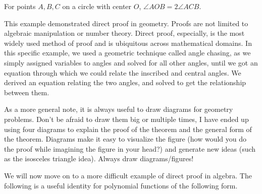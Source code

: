 \begin{theorem}
For points $A, B, C$ on a circle with center $O$, $\angle AOB = 2 \angle ACB$.
\begin{center}
\end{center}
\end{theorem}

This example demonstrated direct proof in geometry. Proofs are not limited to algebraic manipulation or number theory. Direct proof, especially, is the most widely used method of proof and is ubiquitous across mathematical domains. In this specific example, we used a geometric technique called angle chasing, as we simply assigned variables to angles and solved for all other angles, until we got an equation through which we could relate the inscribed and central angles. We derived an equation relating the two angles, and solved to get the relationship between them. 

As a more general note, it is always useful to draw diagrams for geometry problems. Don't be afraid to draw them big or multiple times, I have ended up using four diagrams to explain the proof of the theorem and the general form of the theorem. Diagrams make it easy to visualize the figure (how would you do the proof while imagining the figure in your head?) and generate new ideas (such as the isosceles triangle idea). Always draw diagrams/figures!

We will now move on to a more difficult example of direct proof in algebra. The following is a useful identity for polynomial functions of the following form.

